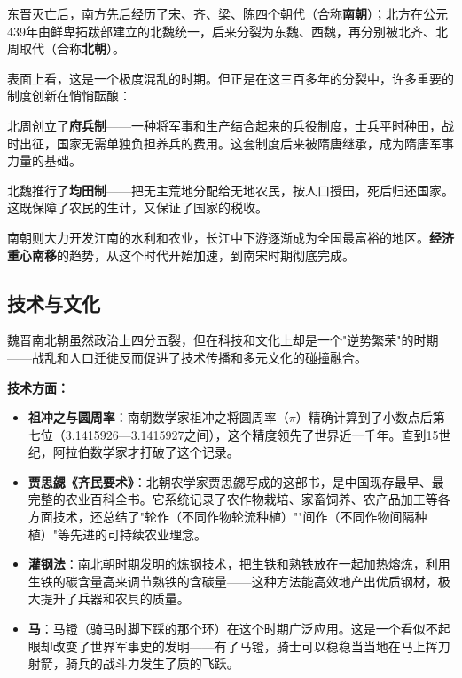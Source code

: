 \documentclass[a4paper,12pt]{ctexart}
\begin{document}
东晋灭亡后，南方先后经历了宋、齐、梁、陈四个朝代（合称\textbf{南朝}）；北方在公元439年由鲜卑拓跋部建立的北魏统一，后来分裂为东魏、西魏，再分别被北齐、北周取代（合称\textbf{北朝}）。

表面上看，这是一个极度混乱的时期。但正是在这三百多年的分裂中，许多重要的制度创新在悄悄酝酿：

北周创立了\textbf{府兵制}——一种将军事和生产结合起来的兵役制度，士兵平时种田，战时出征，国家无需单独负担养兵的费用。这套制度后来被隋唐继承，成为隋唐军事力量的基础。

北魏推行了\textbf{均田制}——把无主荒地分配给无地农民，按人口授田，死后归还国家。这既保障了农民的生计，又保证了国家的税收。

南朝则大力开发江南的水利和农业，长江中下游逐渐成为全国最富裕的地区。\textbf{经济重心南移}的趋势，从这个时代开始加速，到南宋时期彻底完成。

\subsection*{技术与文化}

魏晋南北朝虽然政治上四分五裂，但在科技和文化上却是一个"逆势繁荣"的时期——战乱和人口迁徙反而促进了技术传播和多元文化的碰撞融合。

\textbf{技术方面：}
\begin{itemize}
  \item \textbf{祖冲之与圆周率}：南朝数学家祖冲之将圆周率（$\pi$）精确计算到了小数点后第七位（3.1415926—3.1415927之间），这个精度领先了世界近一千年。直到15世纪，阿拉伯数学家才打破了这个记录。
  \item \textbf{贾思勰《齐民要术》}：北朝农学家贾思勰写成的这部书，是中国现存最早、最完整的农业百科全书。它系统记录了农作物栽培、家畜饲养、农产品加工等各方面技术，还总结了"轮作（不同作物轮流种植）""间作（不同作物间隔种植）"等先进的可持续农业理念。
  \item \textbf{灌钢法}：南北朝时期发明的炼钢技术，把生铁和熟铁放在一起加热熔炼，利用生铁的碳含量高来调节熟铁的含碳量——这种方法能高效地产出优质钢材，极大提升了兵器和农具的质量。
  \item \textbf{马}：马镫（骑马时脚下踩的那个环）在这个时期广泛应用。这是一个看似不起眼却改变了世界军事史的发明——有了马镫，骑士可以稳稳当当地在马上挥刀射箭，骑兵的战斗力发生了质的飞跃。
\end{itemize}
\end{document}
